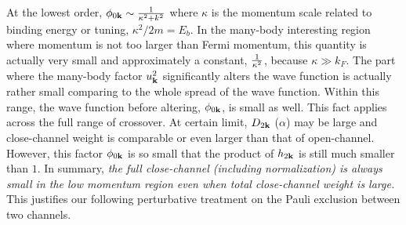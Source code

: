 


At the lowest order, $\phi_{0\mathbf{k}}\sim\frac{1}{\kappa^{2}+k^{2}}$ where $\kappa$ is the momentum scale related to binding energy or tuning, $\kappa^{2}/2m=E_{b}$.     In the many-body interesting region where momentum is not too larger than Fermi momentum, this quantity is actually very small and approximately a constant, $\frac{1}{\kappa^{2}}$, because $\kappa{}\gg{}k_{F}$.  The part where the many-body factor $u_{\mathbf{k}}^{2}$ significantly alters the wave function is actually rather small comparing to the whole spread of the wave function.  Within this range, the wave function before altering, $\phi_{0\mathbf{k}}$, is small as well.   This fact applies across the full range of crossover.  At certain limit, $D_{2\mathbf{k}}$ ($\alpha$) may be large and close-channel weight is comparable or even larger than that of open-channel. However, this factor $\phi_{0\mathbf{k}}$ is so small that the product of $h_{2\mathbf{k}}$ is still much smaller than $1$.  
In summary, \emph{the full close-channel (including normalization) is always small in the low momentum region  even when total close-channel weight is large.}  This justifies our following perturbative treatment on the Pauli exclusion between two channels. 


